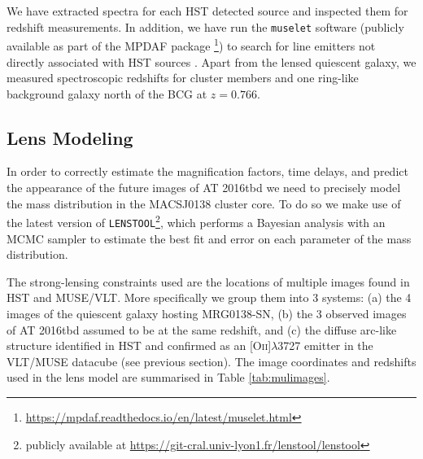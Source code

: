 \documentclass[12pt]{article}
\def\SNABC{AT 2016tbd\xspace}
\def\lenstool{{\tt LENSTOOL}\xspace}
\begin{document}
{We have extracted spectra for each HST detected source and inspected them for redshift measurements. In addition, we have run the {\tt muselet} software (publicly available as part of the MPDAF package \cite{piqueras_mpdaf_2019}\footnote{\url{https://mpdaf.readthedocs.io/en/latest/muselet.html}}) to search for line emitters not directly associated with HST sources \cite{mahler_strong_2018,lagattuta_probing_2019}. Apart from the lensed quiescent galaxy, we measured spectroscopic redshifts for cluster members and one ring-like background galaxy north of the BCG at $z=0.766$.

\subsection*{Lens Modeling}

In order to correctly estimate the magnification factors, time delays, and predict the appearance of the future images of \SNABC we need to precisely model the mass distribution in the MACSJ0138 cluster core. To do so we make use of the latest version of \lenstool \cite{jullo_bayesian_2007}\footnote{publicly available at \url{ https://git-cral.univ-lyon1.fr/lenstool/lenstool}}, which performs a Bayesian analysis with an MCMC sampler to estimate the best fit and error on each parameter of the mass distribution. 

The strong-lensing constraints used are the locations of multiple images found in HST and MUSE/VLT. More specifically we group them into 3 systems: (a) the 4 images of the quiescent galaxy hosting MRG0138-SN, (b) the 3 observed images of \SNABC assumed to be at the same redshift, and (c) the diffuse arc-like structure identified in HST and confirmed as an [O\textsc{ii}]$\lambda$3727 emitter in the VLT/MUSE datacube (see previous section). The image coordinates and redshifts used in the lens model are summarised in Table \ref{tab:mulimages}.

}
\end{document}
